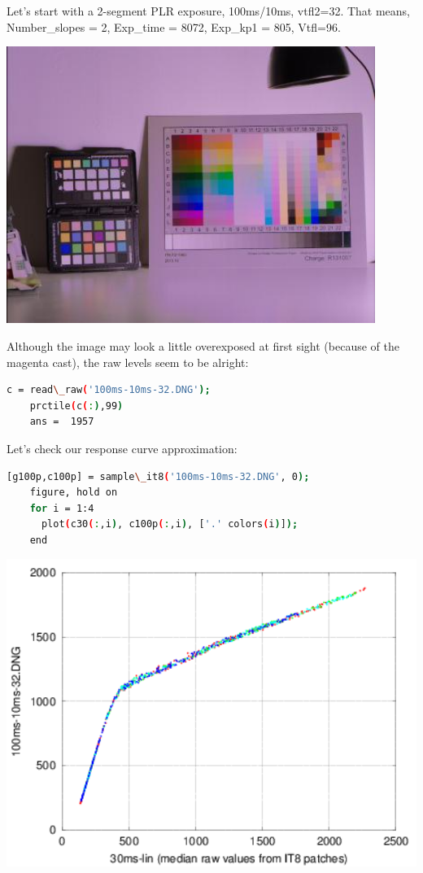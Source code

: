 Let's start with a 2-segment PLR exposure, 100ms/10ms, vtfl2=32. That means, Number\_slopes = 2, Exp\_time = 8072, Exp\_kp1 = 805, Vtfl=96. 

\begin{center}
\includegraphics[height=9cm]{images/100ms-10ms-32}
\end{center}

Although the image may look a little overexposed at first sight (because of the magenta cast), the raw levels seem to be alright: 

\begin{lstlisting}[language=bash,morekeywords=$,keywordstyle=\bfseries,frame=none,xleftmargin=.25in,belowskip=2em, aboveskip=2em]
    c = read\_raw('100ms-10ms-32.DNG');
    prctile(c(:),99)
    ans =  1957
\end{lstlisting}


Let's check our response curve approximation:

 \begin{lstlisting}[language=bash,morekeywords=$,keywordstyle=\bfseries,frame=none,xleftmargin=.25in,belowskip=2em, aboveskip=2em]
    [g100p,c100p] = sample\_it8('100ms-10ms-32.DNG', 0);
    figure, hold on
    for i = 1:4
      plot(c30(:,i), c100p(:,i), ['.' colors(i)]);
    end
\end{lstlisting}

\begin{center}
\includegraphics[height=10cm]{images/100-10-32-plr-vs-30ms-lin}
\end{center}

